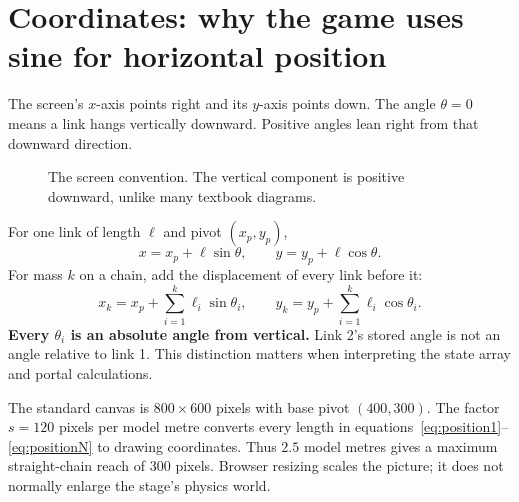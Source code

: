 \documentclass[11pt,a4paper]{article}
\begin{document}
\section{Coordinates: why the game uses sine for horizontal position}
The screen's \(x\)-axis points right and its \(y\)-axis points down. The angle \(\theta=0\) means a link hangs vertically downward. Positive angles lean right from that downward direction.
\begin{figure}[H]\centering
{}
\caption{The screen convention. The vertical component is positive downward, unlike many textbook diagrams.}
\end{figure}
For one link of length \(\ell\) and pivot \((x_p,y_p)\),
\begin{equation}\label{eq:position1}x=x_p+\ell\sin\theta,\qquad y=y_p+\ell\cos\theta.\end{equation}
For mass \(k\) on a chain, add the displacement of every link before it:
\begin{equation}\label{eq:positionN}
x_k=x_p+\sum_{i=1}^{k}\ell_i\sin\theta_i,\qquad y_k=y_p+\sum_{i=1}^{k}\ell_i\cos\theta_i.
\end{equation}
\textbf{Every \(\theta_i\) is an absolute angle from vertical.} Link 2's stored angle is not an angle relative to link 1. This distinction matters when interpreting the state array and portal calculations.

The standard canvas is \(800\times600\) pixels with base pivot \((400,300)\). The factor \(s=120\) pixels per model metre converts every length in equations~\eqref{eq:position1}--\eqref{eq:positionN} to drawing coordinates. Thus \(2.5\) model metres gives a maximum straight-chain reach of \(300\) pixels. Browser resizing scales the picture; it does not normally enlarge the stage's physics world.
\end{document}
